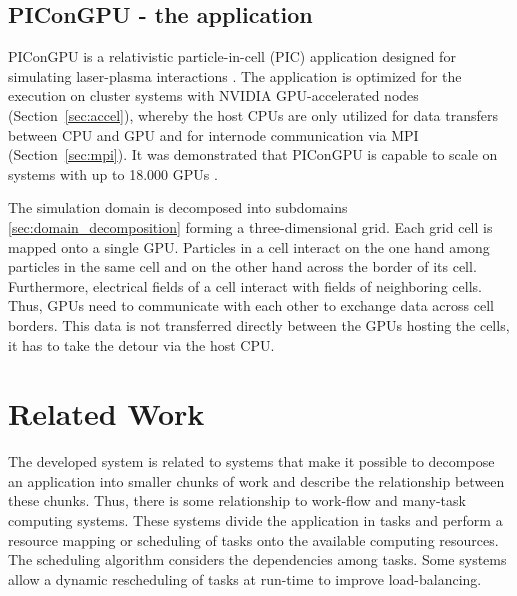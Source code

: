 \subsection{PIConGPU - the application}
\label{sec:picongpu}
PIConGPU is a relativistic particle-in-cell (PIC) application designed
for simulating laser-plasma interactions \cite{ref:picongpu}.  The
application is optimized for the execution on cluster systems with
NVIDIA GPU-accelerated nodes (Section~\ref{sec:accel}), whereby the
host CPUs are only utilized for data transfers between CPU and GPU and
for internode communication via MPI (Section~\ref{sec:mpi}). It was
demonstrated that PIConGPU is capable to scale on systems with up to
18.000 GPUs \cite{ref:picongpu_scale}.

The simulation domain is decomposed into subdomains
\ref{sec:domain_decomposition} forming a three-dimensional grid. Each
grid cell is mapped onto a single GPU. Particles in a cell interact on
the one hand among particles in the same cell and on the other hand
across the border of its cell. Furthermore, electrical fields of a
cell interact with fields of neighboring cells. Thus, GPUs need to
communicate with each other to exchange data across cell
borders. This data is not transferred directly between the GPUs
hosting the cells, it has to take the detour via the host CPU.

\section{Related Work}
\label{sec:related_work}
The developed system is related to systems that make it possible to
decompose an application into smaller chunks of work and describe the
relationship between these chunks.  Thus, there is some relationship
to work-flow and many-task computing systems. These systems divide the
application in tasks and perform a resource mapping or scheduling of
tasks onto the available computing resources. The scheduling algorithm
considers the dependencies among tasks. Some systems allow a dynamic
rescheduling of tasks at run-time to improve load-balancing.

